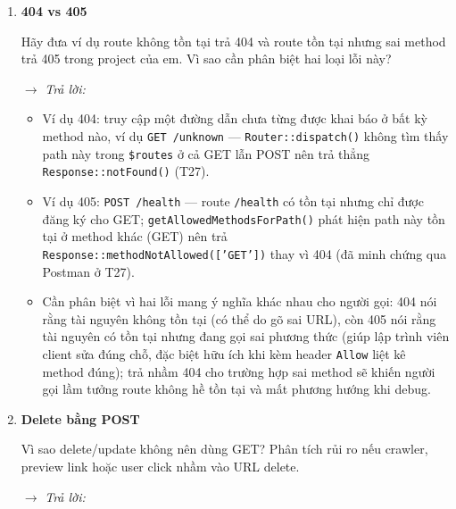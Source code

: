 \begin{enumerate}[label = \textbf{\arabic*.}, leftmargin=*]
    \item \textbf{404 vs 405}

    Hãy đưa ví dụ route không tồn tại trả 404 và route tồn tại nhưng sai method trả 405 trong project của em. Vì sao cần phân biệt hai loại lỗi này?

    \hspace*{-0.6cm} $\rightarrow$ \textit{Trả lời:}

    \begin{itemize}[leftmargin = 0.55cm, label = $\bullet$]
        \item Ví dụ 404: truy cập một đường dẫn chưa từng được khai báo ở bất kỳ method nào, ví dụ \texttt{GET /unknown} — \texttt{Router::dispatch()} không tìm thấy path này trong \texttt{\$routes} ở cả GET lẫn POST nên trả thẳng \texttt{Response::notFound()} (T27).
        \item Ví dụ 405: \texttt{POST /health} — route \texttt{/health} có tồn tại nhưng chỉ được đăng ký cho GET; \texttt{getAllowedMethodsForPath()} phát hiện path này tồn tại ở method khác (GET) nên trả \texttt{Response::methodNotAllowed(['GET'])} thay vì 404 (đã minh chứng qua Postman ở T27).
        \item Cần phân biệt vì hai lỗi mang ý nghĩa khác nhau cho người gọi: 404 nói rằng tài nguyên không tồn tại (có thể do gõ sai URL), còn 405 nói rằng tài nguyên có tồn tại nhưng đang gọi sai phương thức (giúp lập trình viên client sửa đúng chỗ, đặc biệt hữu ích khi kèm header \texttt{Allow} liệt kê method đúng); trả nhầm 404 cho trường hợp sai method sẽ khiến người gọi lầm tưởng route không hề tồn tại và mất phương hướng khi debug.
    \end{itemize}

    \item \textbf{Delete bằng POST}

    Vì sao delete/update không nên dùng GET? Phân tích rủi ro nếu crawler, preview link hoặc user click nhầm vào URL delete.

    \hspace*{-0.6cm} $\rightarrow$ \textit{Trả lời:}


\end{enumerate}
